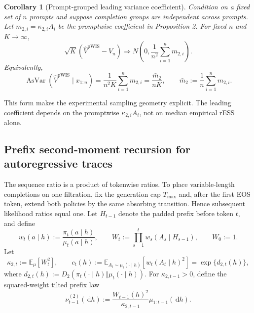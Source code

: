 \documentclass[10pt]{article}
\newtheorem{corollary}{Corollary}
\theoremstyle{remark}
\newcommand{\E}{\mathbb{E}}
\newcommand{\AsVar}{\operatorname{AsVar}}
\newcommand{\pWIS}{\mathrm{pWIS}}
\newcommand{\dd}{\,\mathrm{d}}
\begin{document}
\begin{corollary}[Prompt-grouped leading variance coefficient]
Condition on a fixed set of $n$ prompts and suppose completion groups are independent across prompts. Let $m_{2,i}=\kappa_{2,i}A_i$ be the promptwise coefficient in Proposition 2. For fixed $n$ and $K\to\infty$,
\begin{equation}
\sqrt K\left(\widehat V^{\pWIS}-V_n\right)\Rightarrow
N\!\left(0,\frac1{n^2}\sum_{i=1}^{n}m_{2,i}\right).
\end{equation}
Equivalently,
\begin{equation}
\AsVar(\widehat V^{\pWIS}\mid x_{1:n})=\frac1{n^2K}\sum_{i=1}^{n}m_{2,i}=\frac{\bar m_2}{nK},\qquad
\bar m_2:=\frac1n\sum_{i=1}^{n}m_{2,i}.
\end{equation}
\end{corollary}
This form makes the experimental sampling geometry explicit. The leading coefficient depends on the promptwise $\kappa_{2,i}A_i$, not on median empirical rESS alone.

\subsection{Prefix second-moment recursion for autoregressive traces}
The sequence ratio is a product of tokenwise ratios. To place variable-length completions on one filtration, fix the generation cap $T_{\max}$ and, after the first EOS token, extend both policies by the same absorbing transition. Hence subsequent likelihood ratios equal one. Let $H_{t-1}$ denote the padded prefix before token $t$, and define
\begin{equation}
w_t(a\mid h):=\frac{\pi_t(a\mid h)}{\mu_t(a\mid h)},\qquad
W_t:=\prod_{s=1}^{t}w_s(A_s\mid H_{s-1}),\qquad W_0:=1.
\end{equation}
Let
\begin{equation}
\kappa_{2,t}:=\E_\mu[W_t^2],\qquad
c_t(h):=\E_{A_t\sim\mu_t(\cdot\mid h)}[w_t(A_t\mid h)^2]=\exp\{d_{2,t}(h)\},
\end{equation}
where $d_{2,t}(h):=D_2(\pi_t(\cdot\mid h)\Vert\mu_t(\cdot\mid h))$. For $\kappa_{2,t-1}>0$, define the squared-weight tilted prefix law
\begin{equation}
\nu_{t-1}^{(2)}(\dd h):=\frac{W_{t-1}(h)^2}{\kappa_{2,t-1}}\mu_{1:t-1}(\dd h).
\end{equation}
\end{document}
